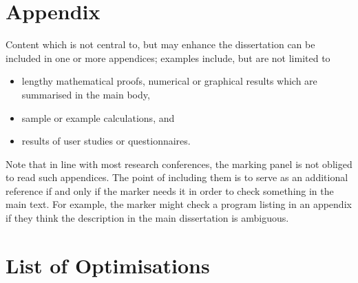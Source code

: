 \documentclass[ oneside,%
                    author={Joshua Felmeden},
                    degree={MEng},
                     title={Sentiment Analysis of Financial Headlines Based on Realised Stock Returns},
                  subtitle={Research}]{dissertation}
\begin{document}








\backmatter

% 
\printbibliography



\appendix

% 
\chapter{Appendix}
\label{appx}

Content which is not central to, but may enhance the dissertation can be 
included in one or more appendices; examples include, but are not limited
to

\begin{itemize}
\item lengthy mathematical proofs, numerical or graphical results which 
      are summarised in the main body,
\item sample or example calculations, 
      and
\item results of user studies or questionnaires.
\end{itemize}

\noindent
Note that in line with most research conferences, the marking panel is not
obliged to read such appendices. The point of including them is to serve as
an additional reference if and only if the marker needs it in order to check
something in the main text. For example, the marker might check a program listing 
in an appendix if they think the description in the main dissertation is ambiguous.

\chapter{List of Optimisations}
\end{document}
